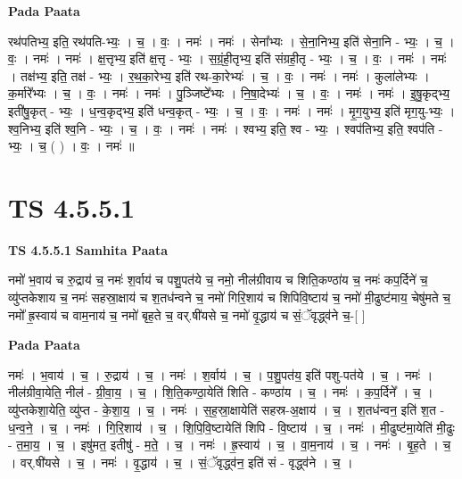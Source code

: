 \documentclass[17pt]{extarticle}
\begin{document}
\textbf{Pada Paata} \newline

रथ॑पतिभ्य॒ इति॒ रथ॑पति-भ्यः॒ । च॒ । वः॒ । नमः॑ । नमः॑ । सेना᳚भ्यः । से॒ना॒निभ्य॒ इति॑ सेना॒नि - भ्यः॒ । च॒ । वः॒ । नमः॑ । नमः॑ । क्ष॒त्तृभ्य॒ इति॑ क्ष॒त्तृ - भ्यः॒ । स॒ग्रं॒ही॒तृभ्य॒ इति॑ संग्रही॒तृ - भ्यः॒ । च॒ । वः॒ । नमः॑ । नमः॑ । तक्ष॑भ्य॒ इति॒ तक्ष॑ - भ्यः॒ । र॒थ॒का॒रेभ्य॒ इति॑ रथ-का॒रेभ्यः॑ । च॒ । वः॒ । नमः॑ । नमः॑ । कुला॑लेभ्यः । क॒र्मारे᳚भ्यः । च॒ । वः॒ । नमः॑ । नमः॑ । पु॒ञ्जिष्टे᳚भ्यः । नि॒षा॒देभ्यः॑ । च॒ । वः॒ । नमः॑ । नमः॑ । इ॒षु॒कृद्भ्य॒ इती॑षु॒कृत् - भ्यः॒ । ध॒न्व॒कृद्भ्य॒ इति॑ धन्व॒कृत् - भ्यः॒ । च॒ । वः॒ । नमः॑ । नमः॑ । मृ॒ग॒युभ्य॒ इति॑ मृग॒यु-भ्यः॒ । श्व॒निभ्य॒ इति॑ श्व॒नि - भ्यः॒ । च॒ । वः॒ । नमः॑ । नमः॑ । श्वभ्य॒ इति॒ श्व - भ्यः॒ । श्वप॑तिभ्य॒ इति॒ श्वप॑ति - भ्यः॒ । च॒ ( ) । वः॒ । नमः॑ ॥  \newline





\section{ TS 4.5.5.1 }

\textbf{TS 4.5.5.1 } \newline
\textbf{Samhita Paata} \newline

नमो॑ भ॒वाय॑ च रु॒द्राय॑ च॒ नमः॑ श॒र्वाय॑ च पशु॒पत॑ये च॒ नमो॒ नील॑ग्रीवाय च शिति॒कण्ठा॑य च॒ नमः॑ कप॒र्दिने॑ च॒ व्यु॑प्तकेशाय च॒ नमः॑ सहस्रा॒क्षाय॑ च श॒तध॑न्वने च॒ नमो॑ गिरि॒शाय॑ च शिपिवि॒ष्टाय॑ च॒ नमो॑ मी॒ढुष्ट॑माय॒ चेषु॑मते च॒ नमो᳚ ह्र॒स्वाय॑ च वाम॒नाय॑ च॒ नमो॑ बृह॒ते च॒ वर्.षी॑यसे च॒ नमो॑ वृ॒द्धाय॑ च सं॒ॅवृद्ध्व॑ने च॒-[  ] \newline

\textbf{Pada Paata} \newline

नमः॑ । भ॒वाय॑ । च॒ । रु॒द्राय॑ । च॒ । नमः॑ । श॒र्वाय॑ । च॒ । प॒शु॒पत॑य॒ इति॑ पशु-पत॑ये । च॒ । नमः॑ । नील॑ग्रीवा॒येति॒ नील॑ - ग्री॒वा॒य॒ । च॒ । शि॒ति॒कण्ठा॒येति॑ शिति - कण्ठा॑य । च॒ । नमः॑ । क॒प॒र्दिने᳚ । च॒ । व्यु॑प्तकेशा॒येति॒ व्यु॑प्त - के॒शा॒य॒ । च॒ । नमः॑ । स॒ह॒स्रा॒क्षायेति॑ सहस्र-अ॒क्षाय॑ । च॒ । श॒तध॑न्वन॒ इति॑ श॒त - ध॒न्व॒ने॒ । च॒ । नमः॑ । गि॒रि॒शाय॑ । च॒ । शि॒पि॒वि॒ष्टायेति॑ शिपि - वि॒ष्टाय॑ । च॒ । नमः॑ । मी॒ढुष्ट॑मा॒येति॑ मी॒ढुः - त॒मा॒य॒ । च॒ । इषु॑मत॒ इतीषु॑ - म॒ते॒ । च॒ । नमः॑ । ह्र॒स्वाय॑ । च॒ । वा॒म॒नाय॑ । च॒ । नमः॑ । बृ॒ह॒ते । च॒ । वर्.षी॑यसे । च॒ । नमः॑ । वृ॒द्धाय॑ । च॒ । सं॒ॅवृद्ध्व॑न॒ इति॑ सं - वृद्ध्व॑ने । च॒ ।  \newline
\end{document}
